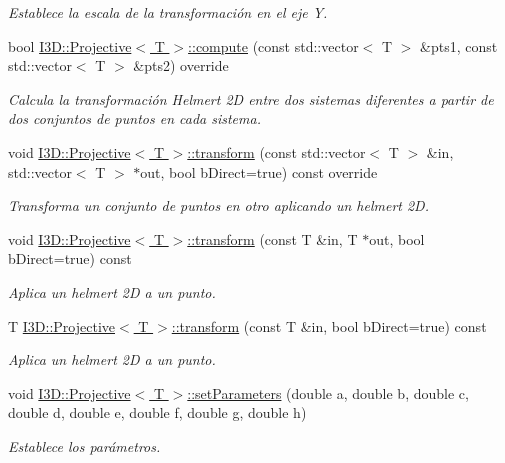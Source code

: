 \begin{DoxyCompactItemize}
\begin{DoxyCompactList}\small\item\em Establece la escala de la transformación en el eje Y. \end{DoxyCompactList}\item 
bool \hyperlink{group__trf2_d_group_gaae888e9e90db1050898b63386252fc88}{I3\+D\+::\+Projective$<$ T $>$\+::compute} (const std\+::vector$<$ T $>$ \&pts1, const std\+::vector$<$ T $>$ \&pts2) override
\begin{DoxyCompactList}\small\item\em Calcula la transformación Helmert 2D entre dos sistemas diferentes a partir de dos conjuntos de puntos en cada sistema. \end{DoxyCompactList}\item 
void \hyperlink{group__trf2_d_group_ga9339dfc7f978fa6bbb9e2233930e8a3c}{I3\+D\+::\+Projective$<$ T $>$\+::transform} (const std\+::vector$<$ T $>$ \&in, std\+::vector$<$ T $>$ $\ast$out, bool b\+Direct=true) const  override
\begin{DoxyCompactList}\small\item\em Transforma un conjunto de puntos en otro aplicando un helmert 2D. \end{DoxyCompactList}\item 
void \hyperlink{group__trf2_d_group_ga1ecc0ebf8cc05c94bd9d9033416ac358}{I3\+D\+::\+Projective$<$ T $>$\+::transform} (const T \&in, T $\ast$out, bool b\+Direct=true) const 
\begin{DoxyCompactList}\small\item\em Aplica un helmert 2D a un punto. \end{DoxyCompactList}\item 
T \hyperlink{group__trf2_d_group_gaf5ad47e08dc23464413870c2b7da4fc0}{I3\+D\+::\+Projective$<$ T $>$\+::transform} (const T \&in, bool b\+Direct=true) const 
\begin{DoxyCompactList}\small\item\em Aplica un helmert 2D a un punto. \end{DoxyCompactList}\item 
void \hyperlink{group__trf2_d_group_gaf03861962a0be948aaa7e032b9e1729b}{I3\+D\+::\+Projective$<$ T $>$\+::set\+Parameters} (double a, double b, double c, double d, double e, double f, double g, double h)
\begin{DoxyCompactList}\small\item\em Establece los parámetros. \end{DoxyCompactList}\end{DoxyCompactItemize}


